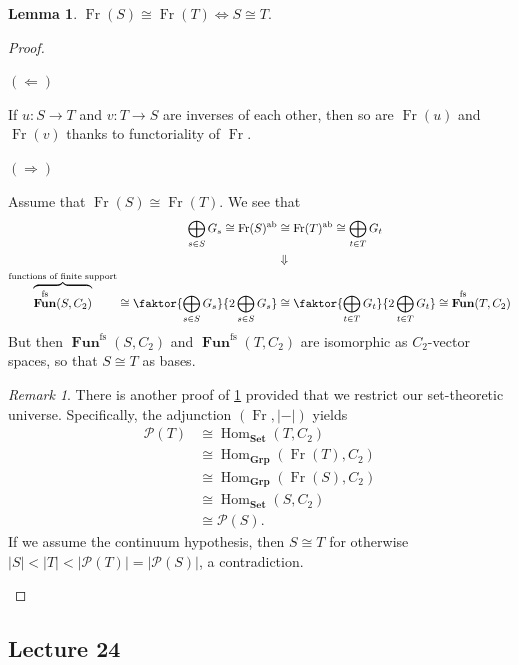 \documentclass[10pt,letterpaper,cm]{nupset}
\theoremstyle{definition}
\theoremstyle{theorem}
\newtheorem{lemma}[definition]{Lemma}
\theoremstyle{remark}
\newtheorem{remark}[definition]{Remark}
\renewcommand{\P}{\mathcal P}
\newcommand{\1}{\mathbf{1}}
\newcommand{\0}{\vec 0}
\DeclareMathOperator{\ab}{ab}
\DeclareMathOperator{\fs}{fs}
\DeclareMathOperator{\Hom}{Hom}
\DeclareMathOperator{\Fun}{\mathbf{Fun}}
\DeclareMathOperator{\Fr}{Fr}
\begin{document}
\begin{lemma}\label{l14}
$\Fr(S) \cong \Fr(T) \iff S\cong T.$ 
\end{lemma}
\begin{proof} $ $

\smallskip

 $(\Longleftarrow)$
 
  If $u: S \to T$ and $v: T\to S$ are inverses of each other, then so are $\Fr(u)$ and $\Fr(v)$ thanks to functoriality of $\Fr$.

\medskip


$(\Longrightarrow)$ 

Assume that $\Fr(S) \cong \Fr(T)$. We see that 
\begin{align*}
\bigoplus_{s\in S} G_s \cong \Fr(S)^{\ab} &  \cong \Fr(T)^{\ab} \cong \bigoplus_{t\in T} G_t 
\\  & \Downarrow
\\ \overbrace{\Fun^{\fs}(S, C_2)}^{\text{functions of finite support}}\cong \faktor{\bigoplus_{s\in S} G_s}{2\bigoplus_{s\in S} G_s} & \cong \faktor{\bigoplus_{t\in T} G_t}{2\bigoplus_{t\in T} G_t}\cong \Fun^{\fs}(T, C_2)
\end{align*}
 But then $\Fun^{\fs}(S, C_2)$ and  $\Fun^{\fs}(T, C_2)$ are isomorphic as $C_2$-vector spaces, so that $S \cong T$ as bases. 
\begin{remark}\label{CH} There is another proof of \cref{l14} provided that we restrict our set-theoretic universe. Specifically,
the adjunction $\left(\Fr, \left\lvert - \right\rvert\right)$ yields  
\begin{align*}
\mathcal{P}(T) & \cong \Hom_{\mathbf{Set}}(T, C_2)
\\ &  \cong \Hom_{\mathbf{Grp}}(\Fr(T), C_2)
\\ & \cong \Hom_{\mathbf{Grp}}(\Fr(S), C_2)
\\ & \cong \Hom_{\mathbf{Set}}(S, C_2)
\\ & \cong \mathcal{P}(S).\end{align*}
If we assume the continuum hypothesis, then $S \cong T$ for otherwise $\left\lvert{S}\right\rvert <\left\lvert{T}\right\rvert <\left\lvert{\P(T)}\right\rvert = \left\lvert{\P(S)}\right\rvert$, a contradiction.
\end{remark}
\end{proof}

\subsection{Lecture 24}
\end{document}
